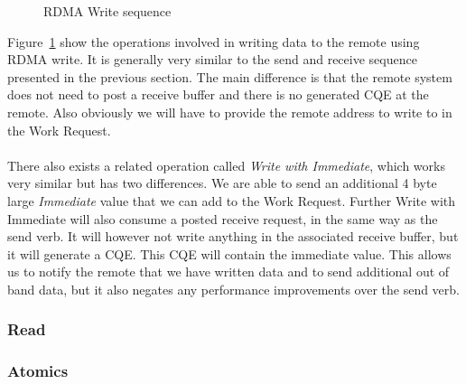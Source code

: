 \begin{figure}[!ht]
\begin{center}
\end{center}
\caption{RDMA Write sequence}
\label{fig:seq-wrt}
\end{figure}

Figure~\ref{fig:seq-wrt} show the operations involved in writing data to the remote using RDMA write. It is generally very
similar to the send and receive sequence presented in the previous section. The main difference is that the remote system does
not need to post a receive buffer and there is no generated CQE at the remote. Also obviously we will have to provide the 
remote address to write to in the Work Request.

\paragraph{} There also exists a related operation called \emph{Write with Immediate}, which works very similar but has two
differences. We are able to send an additional 4 byte large \emph{Immediate} value that we can add to the Work Request. 
Further Write with Immediate will also consume a posted receive request, in the same way as the send verb. It will however 
not write anything in the associated receive buffer, but it will generate a CQE. This CQE will contain the immediate value.
This allows us to notify the remote that we have written data and to send additional out of band data, but it also negates 
any performance improvements over the send verb.


\subsubsection{Read}
\subsubsection{Atomics}
